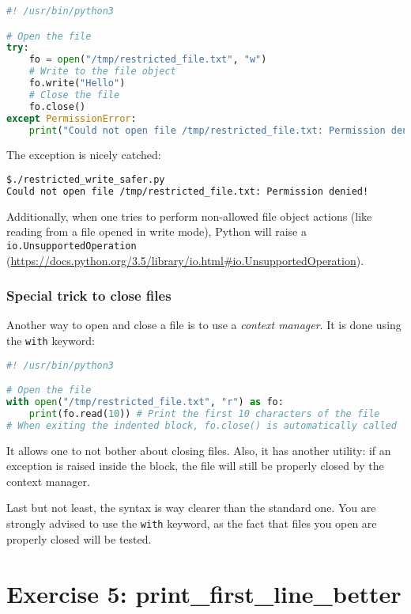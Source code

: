\documentclass[12pt]{article}
\begin{document}
\begin{lstlisting}[language=python,style=codestyle,title=restricted\_write\_safer.py]
#! /usr/bin/python3

# Open the file
try:
    fo = open("/tmp/restricted_file.txt", "w")
    # Write to the file object
    fo.write("Hello")
    # Close the file
    fo.close()
except PermissionError:
    print("Could not open file /tmp/restricted_file.txt: Permission denied!")
\end{lstlisting}

The exception is nicely catched:

\begin{lstlisting}[language=bash]
$./restricted_write_safer.py 
Could not open file /tmp/restricted_file.txt: Permission denied!
\end{lstlisting}

Additionally, when one tries to perform non-allowed file object actions (like reading from a file opened in write mode), Python will raise a \texttt{io.UnsupportedOperation} (\url{https://docs.python.org/3.5/library/io.html\#io.UnsupportedOperation}).

\subsubsection{Special trick to close files}

Another way to open and close a file is to use a \textit{context manager}. It is done using the \texttt{with} keyword:

\begin{lstlisting}[language=python,style=codestyle,title=context\_manager\_read.py]
#! /usr/bin/python3

# Open the file
with open("/tmp/restricted_file.txt", "r") as fo:
    print(fo.read(10)) # Print the first 10 characters of the file
# When exiting the indented block, fo.close() is automatically called
\end{lstlisting}

It allows one to not bother about closing files. Also, it has another utility: if an exception is raised inside the block, the file will still be properly closed by the context manager.

Last but not least, the syntax is way clearer than the standard one. You are strongly advised to use the \texttt{with} keyword, as the fact that files you open are properly closed will be tested.

\section{Exercise 5: print\_first\_line\_better}
\end{document}
